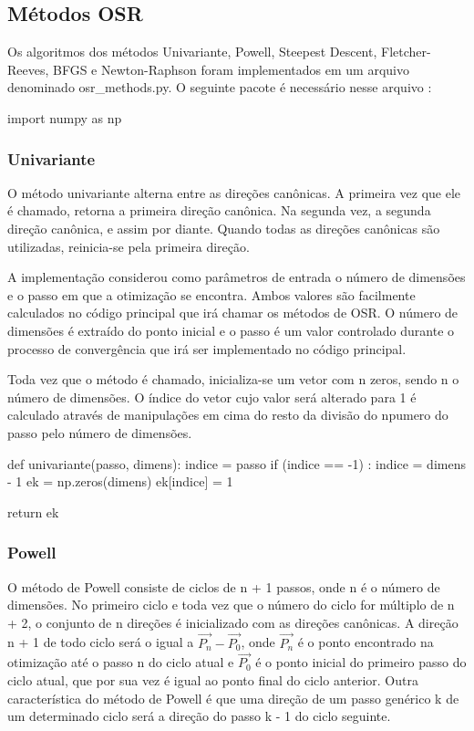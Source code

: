 \documentclass[10pt, a4paper]{article}
\begin{document}
\subsection{Métodos OSR}

Os algoritmos dos métodos Univariante, Powell, Steepest Descent, Fletcher-Reeves, BFGS e Newton-Raphson foram implementados em um arquivo denominado osr\_methods.py. O seguinte pacote é necessário nesse arquivo : 
\begin{python}
  import numpy as np
\end{python}

\subsubsection{Univariante}

O método univariante alterna entre as direções canônicas. A primeira vez que ele é chamado, retorna a primeira direção canônica. Na segunda vez, a segunda direção canônica, e assim por diante.
Quando todas as direções canônicas são utilizadas, reinicia-se pela primeira direção.

A implementação considerou como parâmetros de entrada o número de dimensões  e o passo em que a otimização se encontra. Ambos valores são facilmente calculados no código principal que irá chamar 
os métodos de OSR. O número de dimensões é extraído do ponto inicial e o passo é um valor controlado durante o processo de convergência que irá ser implementado no código principal.

Toda vez que o método é chamado, inicializa-se um vetor com n zeros, sendo n o número de dimensões. O índice do vetor cujo valor será alterado para 1 é calculado 
através de manipulações em cima do resto da divisão do npumero do passo pelo número de dimensões.

\begin{python}
  def univariante(passo, dimens):
    indice = passo%
    if (indice == -1) :
        indice = dimens - 1
    ek = np.zeros(dimens)
    ek[indice] = 1
    
    return ek
\end{python}

\subsubsection{Powell}

O método de Powell consiste de ciclos de n + 1 passos, onde n é o número de dimensões. No primeiro ciclo e toda vez que o número do ciclo for múltiplo de n + 2, 
o conjunto de n direções é inicializado com as direções canônicas. A direção n + 1 de todo ciclo será o igual a  $\overrightarrow{P_n} - \overrightarrow{P_0}$, 
onde $\overrightarrow{P_n}$ é o ponto encontrado na otimização até o passo n do ciclo atual e $\overrightarrow{P_0}$ é o ponto inicial do primeiro passo do ciclo atual,
que por sua vez é igual ao ponto final do ciclo anterior. Outra característica do método de Powell é que uma direção de um passo genérico k de um determinado ciclo será 
a direção do passo k - 1 do ciclo seguinte.
\end{document}
